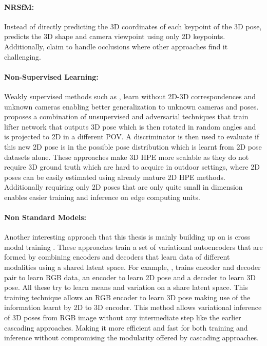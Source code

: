 \paragraph{NRSfM:}
Instead of directly predicting the 3D coordinates of each keypoint of the 3D pose, \cite{DistillNRSfM, c3dpo, deepNRSFM, nrsfm++} predicts the 3D shape and camera viewpoint using only 2D keypoints. Additionally, \cite{c3dpo, nrsfm++} claim to handle occlusions where other approaches find it challenging.

\paragraph{Non-Supervised Learning:}
Weakly supervised methods such as \cite{repnet}, learn without 2D-3D correspondences and unknown cameras enabling better generalization to unknown cameras and poses. \cite{amazon1} proposes a combination of unsupervised and adversarial techniques that train lifter network that outputs 3D pose which is then rotated in random angles and is projected to 2D in a different POV. A discriminator is then used to evaluate if this new 2D pose is in the possible pose distribution which is learnt from 2D pose datasets alone. These approaches make 3D HPE more scalable as they do not require 3D ground truth which are hard to acquire in outdoor settings, where 2D poses can be easily estimated using already mature 2D HPE methods. Additionally requiring only 2D poses that are only quite small in dimension enables easier training and inference on edge computing units. 

\paragraph{Non Standard Models:}
Another interesting approach that this thesis is mainly building up on is cross modal training \cite{CrossingNets, crossmodal}. These approaches train a set of variational autoencoders that are formed by combining encoders and decoders that learn data of different modalities using a shared latent space. For example, \cite{crossmodal}, trains encoder and decoder pair to learn RGB data, an encoder to learn 2D pose and a decoder to learn 3D pose. All these try to learn means and variation on a share latent space. This training technique allows an RGB encoder to learn 3D pose making use of the information learnt by 2D to 3D encoder. This method allows variational inference of 3D poses from RGB image without any intermediate step like the earlier cascading approaches. Making it more efficient and fast for both training and inference without compromising the modularity offered by cascading approaches. 






